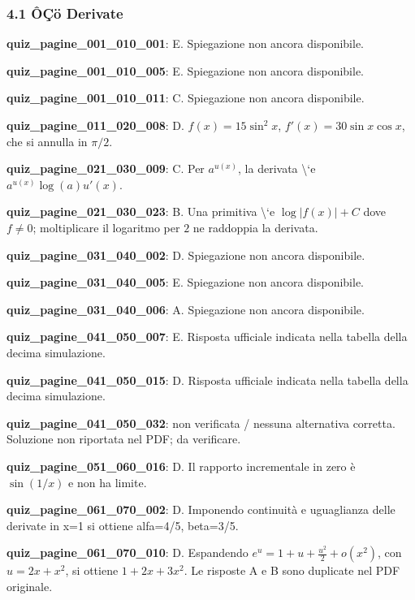 \documentclass[11pt,a4paper]{article}
\newcounter{quiz}
\begin{document}
\subsubsection*{4.1 ÔÇö Derivate}
\noindent\textbf{quiz\_pagine\_001\_010\_001}: E. Spiegazione non ancora disponibile.\par\medskip
\noindent\textbf{quiz\_pagine\_001\_010\_005}: E. Spiegazione non ancora disponibile.\par\medskip
\noindent\textbf{quiz\_pagine\_001\_010\_011}: C. Spiegazione non ancora disponibile.\par\medskip
\noindent\textbf{quiz\_pagine\_011\_020\_008}: D. $f(x)=15\sin^2x$, $f\prime(x)=30\sin x\cos x$, che si annulla in $\pi/2$.\par\medskip
\noindent\textbf{quiz\_pagine\_021\_030\_009}: C. Per $a^{u(x)}$, la derivata \textbackslash{}`e $a^{u(x)}\log(a)u\prime(x)$.\par\medskip
\noindent\textbf{quiz\_pagine\_021\_030\_023}: B. Una primitiva \textbackslash{}`e $\log|f(x)|+C$ dove $f\ne0$; moltiplicare il logaritmo per $2$ ne raddoppia la derivata.\par\medskip
\noindent\textbf{quiz\_pagine\_031\_040\_002}: D. Spiegazione non ancora disponibile.\par\medskip
\noindent\textbf{quiz\_pagine\_031\_040\_005}: E. Spiegazione non ancora disponibile.\par\medskip
\noindent\textbf{quiz\_pagine\_031\_040\_006}: A. Spiegazione non ancora disponibile.\par\medskip
\noindent\textbf{quiz\_pagine\_041\_050\_007}: E. Risposta ufficiale indicata nella tabella della decima simulazione.\par\medskip
\noindent\textbf{quiz\_pagine\_041\_050\_015}: D. Risposta ufficiale indicata nella tabella della decima simulazione.\par\medskip
\noindent\textbf{quiz\_pagine\_041\_050\_032}: non verificata / nessuna alternativa corretta. Soluzione non riportata nel PDF; da verificare.\par\medskip
\noindent\textbf{quiz\_pagine\_051\_060\_016}: D. Il rapporto incrementale in zero è $\sin(1/x)$ e non ha limite.\par\medskip
\noindent\textbf{quiz\_pagine\_061\_070\_002}: D. Imponendo continuità e uguaglianza delle derivate in x=1 si ottiene alfa=4/5, beta=3/5.\par\medskip
\noindent\textbf{quiz\_pagine\_061\_070\_010}: D. Espandendo $e^u=1+u+\frac{u^2}{2}+o(x^2)$, con $u=2x+x^2$, si ottiene $1+2x+3x^2$. Le risposte A e B sono duplicate nel PDF originale.\par\medskip
\end{document}
